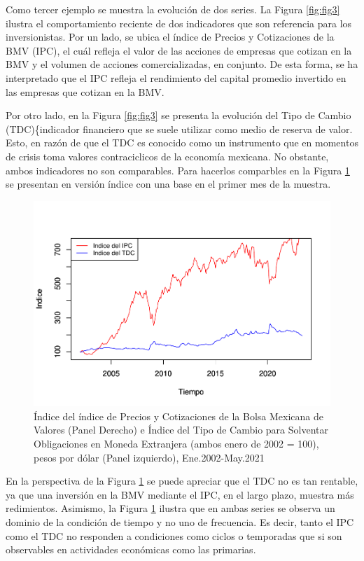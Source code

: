 \documentclass[
]{book}
\begin{document}
Como tercer ejemplo se muestra la evolución de dos series. La Figura \ref{fig:fig3} ilustra el comportamiento reciente de dos indicadores que son referencia para los inversionistas. Por un lado, se ubica el índice de Precios y Cotizaciones de la BMV (IPC), el cuál refleja el valor de las acciones de empresas que cotizan en la BMV y el volumen de acciones comercializadas, en conjunto. De esta forma, se ha interpretado que el IPC refleja el rendimiento del capital promedio invertido en las empresas que cotizan en la BMV.

Por otro lado, en la Figura \ref{fig:fig3} se presenta la evolución del Tipo de Cambio (TDC)\{indicador financiero que se suele utilizar como medio de reserva de valor. Esto, en razón de que el TDC es conocido como un instrumento que en momentos de crisis toma valores contraciclicos de la economía mexicana. No obstante, ambos indicadores no son comparables. Para hacerlos comparbles
en la Figura \ref{fig:fig4} se presentan en versión índice con una base en el primer mes de la muestra.

\begin{figure}

{\centering \includegraphics{bookdown-demo_files/figure-latex/fig4-1} 

}

\caption{Índice del índice de Precios y Cotizaciones de la Bolsa Mexicana de Valores (Panel Derecho) e Índice del Tipo de Cambio para Solventar Obligaciones en Moneda Extranjera (ambos enero de 2002 = 100), pesos por dólar (Panel izquierdo), Ene.2002-May.2021 }\label{fig:fig4}
\end{figure}

En la perspectiva de la Figura \ref{fig:fig4} se puede apreciar que el TDC no es tan rentable, ya que una inversión en la BMV mediante el IPC, en el largo plazo, muestra más redimientos. Asimismo, la Figura \ref{fig:fig4} ilustra que en ambas series se observa un dominio de la condición de tiempo y no uno de frecuencia. Es decir, tanto el IPC como el TDC no responden a condiciones como ciclos o temporadas que si son observables en actividades económicas como las
primarias.
\end{document}
